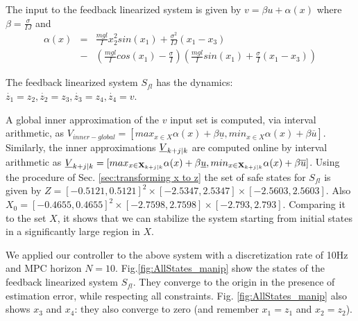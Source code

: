 The input to the feedback linearized system is given by $v=\beta u+ \alpha(x)$ where $\beta=\frac{\sigma}{IJ} $ and 
\begin{eqnarray*}
\label{eq:fblin_inp}
\alpha(x)&=&\frac{mgl}{I}x_2^2sin(x_1) + \frac{\sigma^2}{IJ}(x_1-x_3) \nonumber \\
&-& (\frac{mgl}{I}cos(x_1)-\frac{\sigma}{I})(\frac{mgl}{I}sin(x_1)+\frac{\sigma}{I}(x_1-x_3))
\end{eqnarray*}

The feedback linearized system $S_{fl}$ has the dynamics:
$\dot{z_1} = z_2, \dot{z_2} = z_3, \dot{z_3} = z_4, \dot{z_4} = v$.


A global inner approximation of the $v$ input set is computed, via interval arithmetic, as $V_{inner-global} = [max_{x\in X}\alpha(x) + \beta \underline{u}, min_{x\in X}\alpha(x) + \beta \overline{u}]$. 
Similarly, the inner approximations $\underline{V}_{k+j|k}$ are computed online by interval arithmetic as $\underline{V}_{k+j|k} = [max_{x\in \mathbf{X}_{k+j|k}} \alpha(x) + \beta \underline{u},  min_{x\in \mathbf{X}_{k+j|k}}\alpha(x) + \beta \overline{u}]$. 
Using the procedure of Sec. \ref{sec:transforming x to z} the set of safe states for $S_{fl}$ is given by $Z = [-0.5121, 0.5121]^2 \times [-2.5347, 2.5347] \times [-2.5603, 2.5603]$. Also $X_0 = [-0.4655,0.4655]^2 \times [-2.7598,2.7598] \times [-2.793,2.793]$. Comparing it to the set $X$, it shows that we can stabilize the system starting from initial states in a significantly large region in $X$.

We applied our controller to the above system with a discretization rate of 10Hz and MPC horizon $N=10$.
Fig.\ref{fig:AllStates_manip} show the states of the feedback linearized system $S_{fl}$. 
They converge to the origin in the presence of estimation error, while respecting all constraints.
Fig. \ref{fig:AllStates_manip} also shows $x_3$ and $x_4$: they also converge to zero (and remember $x_1 = z_1$ and $x_2 = z_2$).

